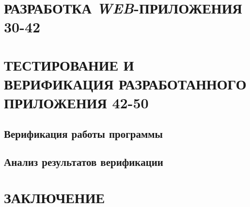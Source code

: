 \documentclass[12pt,a4paper]{styles/report}
\begin{document}
\chapter{РАЗРАБОТКА \textit{WEB}-ПРИЛОЖЕНИЯ 30-42}


\chapter{ТЕСТИРОВАНИЕ И ВЕРИФИКАЦИЯ РАЗРАБОТАННОГО ПРИЛОЖЕНИЯ 42-50}
\section{Верификация работы программы}

\section{Анализ результатов верификации}

\newpage
\chapter*{ЗАКЛЮЧЕНИЕ}


\newpage
\begin{thebibliography}{9999.}



\end{thebibliography}


\end{document}
